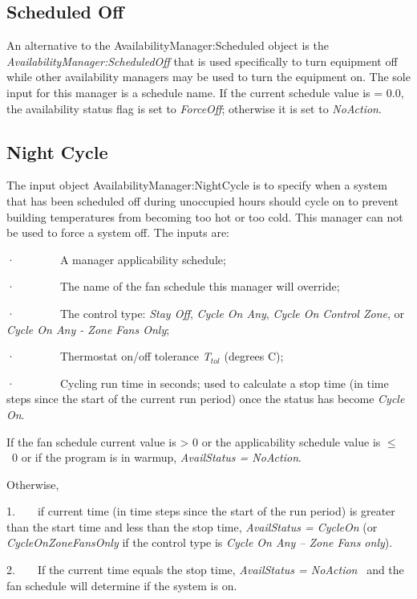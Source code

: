 \subsection{Scheduled Off}\label{scheduled-off}

An alternative to the AvailabilityManager:Scheduled object is the \emph{AvailabilityManager:ScheduledOff} that is used specifically to turn equipment off while other availability managers may be used to turn the equipment on. The sole input for this manager is a schedule name. If the current schedule value is = 0.0, the availability status flag is set to \emph{ForceOff}; otherwise it is set to \emph{NoAction}.

\subsection{Night Cycle}\label{night-cycle}

The input object AvailabilityManager:NightCycle is to specify when a system that has been scheduled off during unoccupied hours should cycle on to prevent building temperatures from becoming too hot or too cold. This manager can not be used to force a system off. The inputs are:

·~~~~~~~~A manager applicability schedule;

·~~~~~~~~The name of the fan schedule this manager will override;

·~~~~~~~~The control type: \emph{Stay Off}, \emph{Cycle On Any}, \emph{Cycle On Control Zone}, or \emph{Cycle On Any - Zone Fans Only};

·~~~~~~~~Thermostat on/off tolerance \emph{T\(_{tol}\)} (degrees C);

·~~~~~~~~Cycling run time in seconds; used to calculate a stop time (in time steps since the start of the current run period) once the status has become \emph{Cycle On}.

If the fan schedule current value is \textgreater{} 0 or the applicability schedule value is \(\le\) ~0 or if the program is in warmup, \emph{AvailStatus = NoAction}.

Otherwise,

1.~~~~if current time (in time steps since the start of the run period) is greater than the start time and less than the stop time, \emph{AvailStatus = CycleOn} (or \emph{CycleOnZoneFansOnly} if the control type is \emph{Cycle On Any -- Zone Fans only}).

2.~~~~If the current time equals the stop time, \emph{AvailStatus = NoAction} ~and the fan schedule will determine if the system is on.

